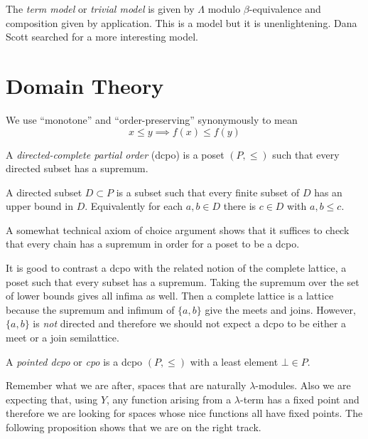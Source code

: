 \documentclass[12pt]{article}
\begin{document}
\begin{rmk}
The \textit{term model} or \textit{trivial model} is given by $\Lambda$ modulo $\beta$-equivalence and composition given by application. This is a model but it is unenlightening. Dana Scott searched for a more interesting model. 
\end{rmk}

\section{Domain Theory}

\begin{rmk}
We use ``monotone'' and ``order-preserving'' synonymously to mean
\[ x \le y \implies f(x) \le f(y) \]
\end{rmk}


\begin{defn}
A \textit{directed-complete partial order} (dcpo) is a poset $(P, \le)$ such that every directed subset has a supremum. 
\end{defn}

\begin{rmk}
A directed subset $D \subset P$ is a subset such that every finite subset of $D$ has an upper bound in $D$. Equivalently for each $a, b \in D$ there is $c \in D$ with $a,b \le c$. 
\end{rmk}

\begin{rmk}
A somewhat technical axiom of choice argument shows that it suffices to check that every chain has a supremum in order for a poset to be a dcpo. 
\end{rmk}

\begin{rmk}
It is good to contrast a dcpo with the related notion of the complete lattice, a poset such that every subset has a supremum. Taking the supremum over the set of lower bounds gives all infima as well. Then a complete lattice is a lattice because the supremum and infimum of $\{ a, b \}$ give the meets and joins. However, $\{ a, b \}$ is \textit{not} directed and therefore we should not expect a dcpo to be either a meet or a join semilattice.  
\end{rmk}

\begin{defn}
A \textit{pointed dcpo} or \textit{cpo} is a dcpo $(P, \le)$ with a least element $\bot \in P$.
\end{defn}

\begin{rmk}
Remember what we are after, spaces that are naturally $\lambda$-modules. Also we are expecting that, using $Y$, any function arising from a $\lambda$-term has a fixed point and therefore we are looking for spaces whose nice functions all have fixed points. The following proposition shows that we are on the right track. 
\end{rmk}
\end{document}
